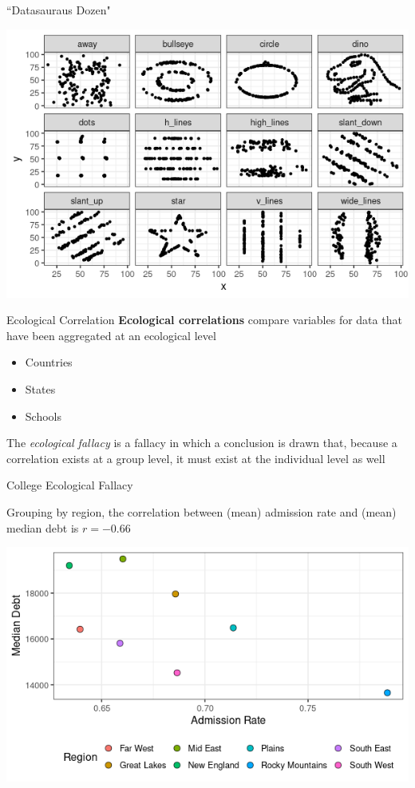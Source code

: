 \documentclass{beamer}
\begin{document}
\begin{frame}{``Datasauraus Dozen"}
\begin{center}
\includegraphics[scale=0.5]{dozen.png}
\end{center}
\end{frame}


\begin{frame}{Ecological Correlation}
\textbf{Ecological correlations} compare variables for data that have been aggregated at an ecological level \\ \vspace{2mm}

\begin{itemize}
\item Countries
\item States
\item Schools
\end{itemize}
\vspace{4mm}
The \textit{ecological fallacy} is a fallacy in which a conclusion is drawn that, because a correlation exists at a group level, it must exist at the individual level as well

\end{frame}


\begin{frame}{College Ecological Fallacy}

Grouping by region, the correlation between (mean) admission rate and (mean) median debt is $r = -0.66$
\begin{center}
\includegraphics[scale=0.5]{cc_group.png}
\end{center}
\end{frame}
\end{document}
